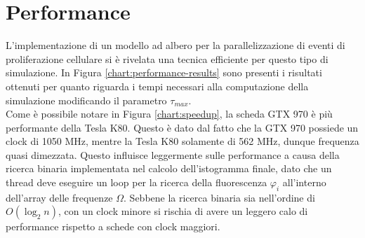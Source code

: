 \section{Performance}

\label{sec:performance}

L'implementazione di un modello ad albero per la parallelizzazione di eventi
di proliferazione cellulare si è rivelata una tecnica efficiente per questo
tipo di simulazione. In Figura \ref{chart:performance-results}
sono presenti i risultati ottenuti per
quanto riguarda i tempi necessari alla computazione della simulazione
modificando il parametro $\tau_{max}$.
\\
Come è possibile notare in Figura \ref{chart:speedup}, la scheda
GTX 970 è più performante della Tesla K80. Questo è dato dal fatto che
la GTX 970 possiede un clock di 1050 MHz, mentre la Tesla K80 solamente di
562 MHz, dunque frequenza quasi dimezzata. Questo influisce leggermente sulle
performance a causa della ricerca binaria implementata nel calcolo
dell'istogramma finale, dato che un thread deve eseguire un loop per la ricerca
della fluorescenza $\varphi_{i}$ all'interno dell'array delle frequenze $\Omega$.
Sebbene la ricerca binaria sia nell'ordine di $O(\log_{2}{n})$, con un clock
minore si rischia di avere un leggero calo di performance rispetto a schede
con clock maggiori.
\\
